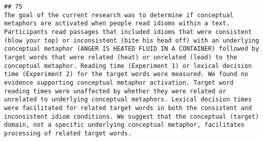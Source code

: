 \documentclass[
  english,
  man]{apa6}
\begin{document}
\begin{verbatim}
## 75                                                                                                                                                                                                                                                                                                                                                                                                                                                                                                                                                                                                                                                                                                                                                                                                                                                                                                                                                                                                                                                                                                                                                                                                                                                                                                                                                                                                                                                                                                                                                                                                                                                         The goal of the current research was to determine if conceptual metaphors are activated when people read idioms within a text. Participants read passages that included idioms that were consistent (blow your top) or inconsistent (bite his head off) with an underlying conceptual metaphor (ANGER IS HEATED FLUID IN A CONTAINER) followed by target words that were related (heat) or unrelated (lead) to the conceptual metaphor. Reading time (Experiment 1) or lexical decision time (Experiment 2) for the target words were measured. We found no evidence supporting conceptual metaphor activation. Target word reading times were unaffected by whether they were related or unrelated to underlying conceptual metaphors. Lexical decision times were facilitated for related target words in both the consistent and inconsistent idiom conditions. We suggest that the conceptual (target) domain, not a specific underlying conceptual metaphor, facilitates processing of related target words.

\end{verbatim}
\end{document}
